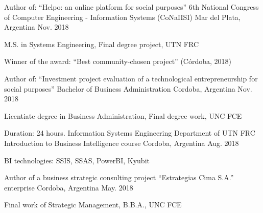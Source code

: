

\begin{cventries}

  \cventry
    {Author of: “Helpo: an online platform for social purposes”} %
    {6th National Congress of Computer Engineering - Information Systems (CoNaIISI)} %
    {Mar del Plata, Argentina} %
    {Nov. 2018} %
    {
      \begin{cvitems} %
        \item {M.S. in Systems Engineering, Final degree project, UTN FRC}
        \item {Winner of the award: “Best community-chosen project” (Córdoba, 2018)}
      \end{cvitems}
    }

  \cventry
    {Author of: “Investment project evaluation of a technological entrepreneurship for social purposes”} %
    {Bachelor of Business Administration} %
    {Cordoba, Argentina} %
    {Nov. 2018} %
    {
      \begin{cvitems} %
        \item {Licentiate degree in Business Administration, Final degree work, UNC FCE}
      \end{cvitems}
    }

  \cventry
    {Duration: 24 hours. Information Systems Engineering Department of UTN FRC} %
    {Introduction to Business Intelligence course} %
    {Cordoba, Argentina} %
    {Aug. 2018} %
    {
      \begin{cvitems} %
        \item {BI technologies: SSIS, SSAS, PowerBI, Kyubit}
      \end{cvitems}
    }

  \cventry
    {Author of a business strategic consulting project} %
    {“Estrategias Cima S.A.” enterprise} %
    {Cordoba, Argentina} %
    {May. 2018} %
    {
      \begin{cvitems} %
        \item {Final work of Strategic Management, B.B.A., UNC FCE}
      \end{cvitems}    
    }


\end{cventries}
